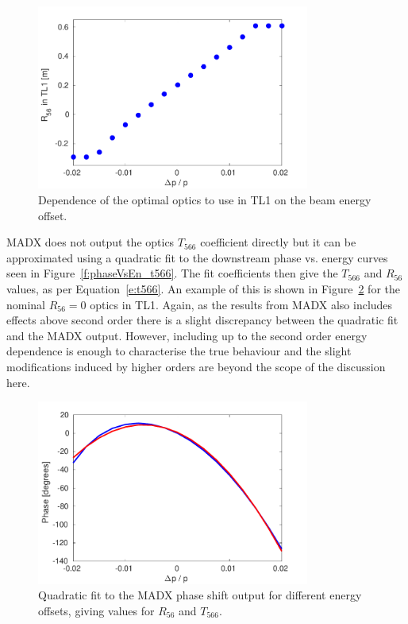 \begin{figure}
  \centering
  \includegraphics[width=0.8\textwidth]{Figures/propagation/optR56vsEnergy}
  \caption{Dependence of the optimal optics to use in TL1 on the beam energy offset.}
  \label{f:optR56vsEnergy}
\end{figure}

MADX does not output the optics \(T_{566}\) coefficient directly but it can be approximated using a quadratic fit to the downstream phase vs. energy curves seen in Figure~\ref{f:phaseVsEn_t566}. The fit coefficients then give the \(T_{566}\) and \(R_{56}\) values, as per Equation~\ref{e:t566}. An example of this is shown in Figure~\ref{f:madxT566Fit} for the nominal \(R_{56}=0\) optics in TL1. Again, as the results from MADX also includes effects above second order there is a slight discrepancy between the quadratic fit and the MADX output. However, including up to the second order energy dependence is enough to characterise the true behaviour and the slight modifications induced by higher orders are beyond the scope of the discussion here.

\begin{figure}
  \centering
  \includegraphics[width=0.8\textwidth]{Figures/propagation/madxT566Fit}
  \caption{Quadratic fit to the MADX phase shift output for different energy offsets, giving values for \(R_{56}\) and \(T_{566}\).}
  \label{f:madxT566Fit}
\end{figure}

